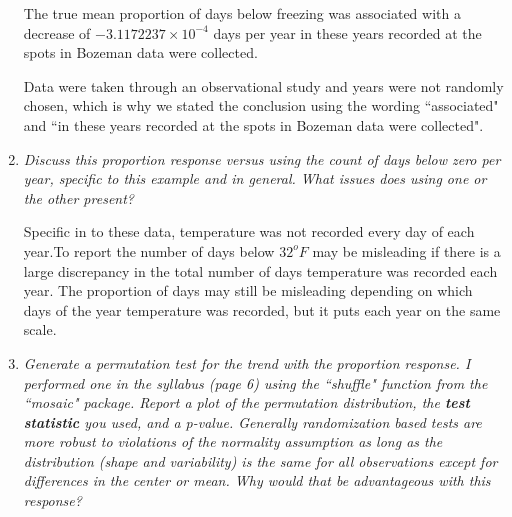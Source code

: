\documentclass[11pt]{article}
\begin{document}
\begin{enumerate}
The true mean proportion of days below freezing was associated with a decrease of \ensuremath{-3.1172237\times 10^{-4}} days per year in these years recorded at the spots in Bozeman data were collected.

Data were taken through an observational study and years were not randomly chosen, which is why we stated the conclusion using the wording ``associated" and ``in these years recorded at the spots in Bozeman data were collected". %

\item%
{\it Discuss this proportion response versus using the count of days below zero per year, specific to this example and in general. What issues does using one or the other present?}

Specific in to these data, temperature was not recorded every day of each year.To report the number of days below $32^{o}F$ may be misleading if there is a large discrepancy in the total number of days temperature was recorded each year. The proportion of days may still be misleading depending on which days of the year temperature was recorded, but it puts each year on the same scale.

\item%
{\it Generate a permutation test for the trend with the proportion response. I performed one in the syllabus (page 6) using the ``shuffle" function from the ``mosaic" package. Report a plot of the permutation distribution, the {\bf test statistic} you used, and a p-value. Generally randomization based tests are more robust to violations of the normality assumption as long as the distribution (shape and variability) is the same for all observations except for differences in the {\it center} or mean. Why would that be advantageous with this response?}

\begin{knitrout}
\color{fgcolor}\begin{kframe}
\begin{alltt}
 \hlkwb{<-} \hlstd{(}\hlstd{)}
 \hlkwb{<-} 

  \hlopt{:}\hlstd{)\{}
   \hlkwb{<-} \hlstd{(}\hlopt{$} \hlopt{~} \hlopt{$}\hlstd{Year)))[}\hlstd{]}
  \hlstd{\}}
\end{alltt}



\end{kframe}
\end{knitrout}
\end{enumerate}
\end{document}
